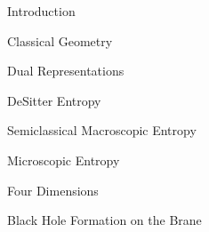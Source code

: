  {Introduction}  \par 
{} {Classical Geometry}  \par 
{} {Dual Representations}  \par 
{} {DeSitter Entropy}  \par 
\noindent {} {Semiclassical Macroscopic Entropy}  \par 
\noindent {} {Microscopic Entropy}  \par 
{} {Four Dimensions}  \par 
{} {Black Hole Formation on the Brane}  \par 

